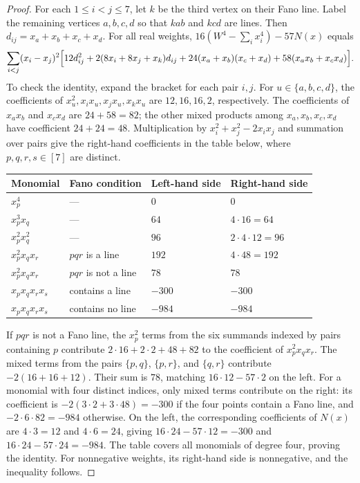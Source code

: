 \documentclass[11pt]{article}
\theoremstyle{remark}
\numberwithin{equation}{section}
\begin{document}
\begin{proof}
For each $1\le i<j\le7$, let $k$ be the third vertex on their Fano line.
Label the remaining vertices $a,b,c,d$ so that $kab$ and $kcd$ are lines.
Then $d_{ij}=x_a+x_b+x_c+x_d$. For all real weights,
$16\left(W^4-\sum_i x_i^4\right)-57N(x)$ equals
\begin{equation*}
\sum_{i<j}(x_i-x_j)^2\Bigl[
      12d_{ij}^2+2(8x_i+8x_j+x_k)d_{ij}+24(x_a+x_b)(x_c+x_d)+58(x_ax_b+x_cx_d)\Bigr].
\end{equation*}
To check the identity, expand the bracket for each pair $i,j$.
For $u\in\{a,b,c,d\}$, the coefficients of
$x_u^2,x_ix_u,x_jx_u,x_kx_u$ are $12,16,16,2$, respectively.
The coefficients of $x_ax_b$ and $x_cx_d$ are $24+58=82$;
the other mixed products among $x_a,x_b,x_c,x_d$ have coefficient
$24+24=48$. Multiplication by $x_i^2+x_j^2-2x_ix_j$ and summation
over pairs give the right-hand coefficients in the table below,
where $p,q,r,s\in[7]$ are distinct.
\begin{center}
\begin{tabular}{llll}
\hline
Monomial & Fano condition & Left-hand side & Right-hand side \\
\hline
$x_p^4$ & --- & $0$ & $0$ \\
$x_p^3x_q$ & --- & $64$ & $4\cdot16=64$ \\
$x_p^2x_q^2$ & --- & $96$ & $2\cdot4\cdot12=96$ \\
$x_p^2x_qx_r$ & $pqr$ is a line & $192$ & $4\cdot48=192$ \\
$x_p^2x_qx_r$ & $pqr$ is not a line & $78$ & $78$ \\
$x_px_qx_rx_s$ & contains a line & $-300$ & $-300$ \\
$x_px_qx_rx_s$ & contains no line & $-984$ & $-984$ \\
\hline
\end{tabular}
\end{center}
If $pqr$ is not a Fano line, the $x_p^2$ terms from the six summands
indexed by pairs containing $p$ contribute
$2\cdot16+2\cdot2+48+82$ to the coefficient of $x_p^2x_qx_r$.
The mixed terms from the pairs $\{p,q\}$, $\{p,r\}$, and $\{q,r\}$
contribute $-2(16+16+12)$. Their sum is $78$, matching
$16\cdot12-57\cdot2$ on the left.
For a monomial with four distinct indices, only mixed terms contribute
on the right: its coefficient is $-2(3\cdot2+3\cdot48)=-300$ if
the four points contain a Fano line, and $-2\cdot6\cdot82=-984$
otherwise. On the left, the corresponding coefficients of $N(x)$
are $4\cdot3=12$ and $4\cdot6=24$, giving
$16\cdot24-57\cdot12=-300$ and $16\cdot24-57\cdot24=-984$.
The table covers all monomials of degree four, proving the identity.
For nonnegative weights, its right-hand side is nonnegative, and the
inequality follows.
\end{proof}
\end{document}
